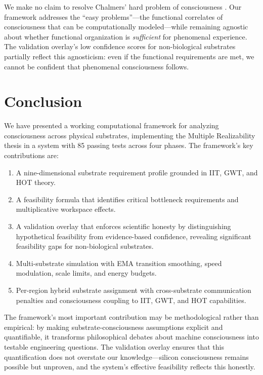 \documentclass[12pt,a4paper]{article}
\begin{document}
We make no claim to resolve Chalmers' hard problem of consciousness \citep{chalmers2010character}. Our framework addresses the ``easy problems''---the functional correlates of consciousness that can be computationally modeled---while remaining agnostic about whether functional organization is \emph{sufficient} for phenomenal experience. The validation overlay's low confidence scores for non-biological substrates partially reflect this agnosticism: even if the functional requirements are met, we cannot be confident that phenomenal consciousness follows.

\section{Conclusion}

We have presented a working computational framework for analyzing consciousness across physical substrates, implementing the Multiple Realizability thesis in a system with 85 passing tests across four phases. The framework's key contributions are:

\begin{enumerate}
    \item A nine-dimensional substrate requirement profile grounded in IIT, GWT, and HOT theory.
    \item A feasibility formula that identifies critical bottleneck requirements and multiplicative workspace effects.
    \item A validation overlay that enforces scientific honesty by distinguishing hypothetical feasibility from evidence-based confidence, revealing significant feasibility gaps for non-biological substrates.
    \item Multi-substrate simulation with EMA transition smoothing, speed modulation, scale limits, and energy budgets.
    \item Per-region hybrid substrate assignment with cross-substrate communication penalties and consciousness coupling to IIT, GWT, and HOT capabilities.
\end{enumerate}

The framework's most important contribution may be methodological rather than empirical: by making substrate-consciousness assumptions explicit and quantifiable, it transforms philosophical debates about machine consciousness into testable engineering questions. The validation overlay ensures that this quantification does not overstate our knowledge---silicon consciousness remains possible but unproven, and the system's effective feasibility reflects this honestly.
\end{document}
